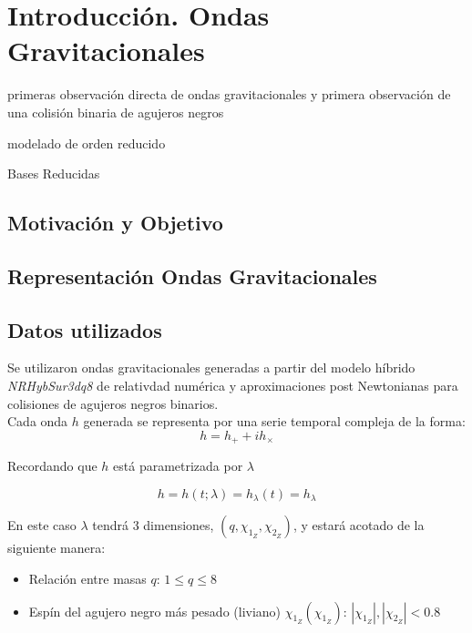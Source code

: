 \chapter{Introducción. Ondas Gravitacionales}

primeras observación directa de ondas gravitacionales y primera observación de una colisión binaria de agujeros negros\cite{LIGOScientific:2016aoc}


 modelado de orden reducido \cite{Tiglio:2021ysj}
 
 Bases Reducidas \cite{rb0book, doi:10.1137/09075250X, PhysRevLett.106.221102, 10.1115/1.1448332, rb1book}




\section{Motivación y Objetivo}
\section{Representación Ondas Gravitacionales}
\section{Datos utilizados}

Se utilizaron ondas gravitacionales generadas a partir del modelo híbrido \textit{NRHybSur3dq8}\cite{Varma_2019} de relativdad numérica y aproximaciones post Newtonianas para colisiones de agujeros negros binarios.
\\

Cada onda \(h\) generada se representa por una serie temporal compleja de la forma:
\[
h = h_+ + ih_{\times}
\]


Recordando que $h$ está parametrizada por \(\lambda\)

 \[h = h(t; \lambda) = h_{\lambda}(t) = h_{\lambda} \]
 
En este caso \(\lambda\) tendrá 3 dimensiones, $(q, \chi_{1_Z},\chi_{2_Z}) $, y estará acotado de la siguiente manera:

\begin{itemize}
\item Relación entre masas $q$: $1 \le q \le 8$
\item Espín del agujero negro más pesado (liviano) $\chi_{1_Z} (\chi_{1_Z})$: $|\chi_{1_Z}|, |\chi_{2_Z}| < 0.8$
\end{itemize}

